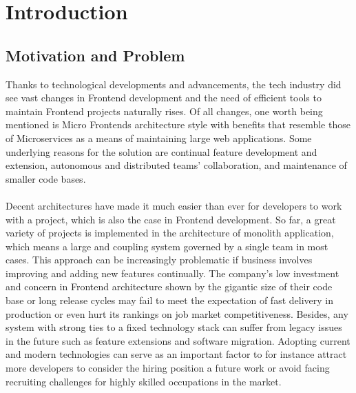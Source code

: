 \documentclass[a4paper]{book}
\begin{document}

\tableofcontents           %
\listoffigures             %
\listoftables              %

\clearpage


\chapter{Introduction}

 \section{Motivation and Problem}
Thanks to technological developments and advancements, the tech industry did see vast changes in Frontend development and the need of efficient tools to maintain Frontend projects naturally rises. Of all changes, one worth being mentioned is Micro Frontends architecture style with benefits that resemble those of Microservices as a means of maintaining large web applications. Some underlying reasons for the solution are continual feature development and extension, autonomous and distributed teams’ collaboration, and maintenance of smaller code bases. 
\\
\\
Decent architectures have made it much easier than ever for developers to work with a project, which is also the case in Frontend development. So far, a great variety of projects is implemented in the architecture of monolith application, which means a large and coupling system governed by a single team in most cases. This approach can be increasingly problematic if business involves improving and adding new features continually. The company’s low investment and concern in Frontend architecture shown by the gigantic size of their code base or long release cycles may fail to meet the expectation of fast delivery in production or even hurt its rankings on job market competitiveness. Besides, any system with strong ties to a fixed technology stack can suffer from legacy issues in the future such as feature extensions and software migration. Adopting current and modern technologies can serve as an important factor to for instance attract more developers to consider the hiring position a future work or avoid facing recruiting challenges for highly skilled occupations in the market.
\end{document}
